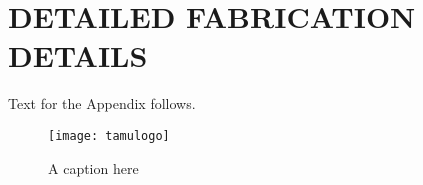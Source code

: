 %
%	 
%


\chapter{DETAILED FABRICATION DETAILS}
\label{appendix:fab}

Text for the Appendix follows.

\begin{figure}[ht]
    \centering
    \texttt{[image: tamulogo]}
    \caption{A caption here}
\end{figure}


